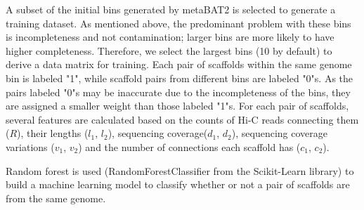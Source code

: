 \documentclass[fleqn,10pt,lineno]{wlpeerj}
\begin{document}
A subset of the initial bins generated by metaBAT2 is selected to generate a training dataset. As mentioned above, the predominant problem with these bins is incompleteness and not contamination; larger bins are more likely to have higher completeness. Therefore, we select the largest bins (10 by default) to derive a data matrix for training. Each pair of scaffolds within the same genome bin is labeled "1", while scaffold pairs from different bins are labeled "0"s. As the pairs labeled "0"s may be inaccurate due to the incompleteness of the bins, they are assigned a smaller weight than those labeled "1"s.  For each pair of scaffolds, several features are calculated based on the counts of Hi-C reads connecting them ($R$), their lengths ($l_1$, $l_2$), sequencing coverage($d_1$, $d_2$), sequencing coverage variations ($v_1$, $v_2$) and the number of connections each scaffold has ($c_1$, $c_2$). 

Random forest is used (RandomForestClassifier from the Scikit-Learn library) to build a machine learning model to classify whether or not a pair of scaffolds are from the same genome. 
\end{document}
